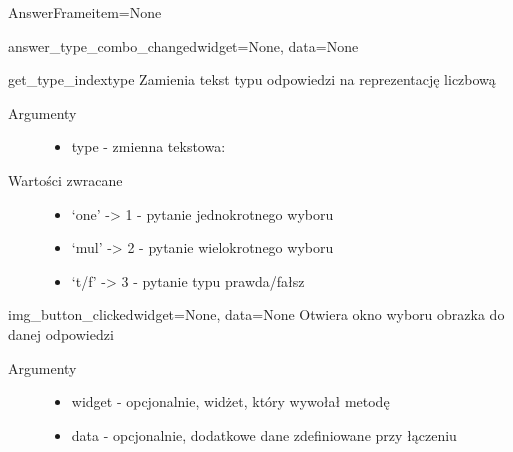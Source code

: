\documentclass[letterpaper,10pt,polish]{manual}
\begin{document}
\begin{classdesc}{AnswerFrame}{item=None}
\begin{methoddesc}{answer\_type\_combo\_changed}{widget=None, data=None}
\begin{description}
\begin{itemize}
\end{itemize}

\end{description}
\end{methoddesc}

\hypertarget{AnswerFrame.AnswerFrame.get\_type\_index}{}\begin{methoddesc}{get\_type\_index}{type}
Zamienia tekst typu odpowiedzi na reprezentację liczbową
\begin{description}
\item[Argumenty] \leavevmode\begin{itemize}
\item {} 
type - zmienna tekstowa:

\end{itemize}

\item[Wartości zwracane] \leavevmode\begin{itemize}
\item {} 
`one' -\textgreater{} 1 - pytanie jednokrotnego wyboru

\item {} 
`mul' -\textgreater{} 2 - pytanie wielokrotnego wyboru

\item {} 
`t/f' -\textgreater{} 3 - pytanie typu prawda/fałsz

\end{itemize}

\end{description}
\end{methoddesc}

\hypertarget{AnswerFrame.AnswerFrame.img\_button\_clicked}{}\begin{methoddesc}{img\_button\_clicked}{widget=None, data=None}
Otwiera okno wyboru obrazka do danej odpowiedzi
\begin{description}
\item[Argumenty] \leavevmode\begin{itemize}
\item {} 
widget - opcjonalnie, widżet, który wywołał metodę

\item {} 
data - opcjonalnie, dodatkowe dane zdefiniowane przy łączeniu

\end{itemize}

\end{description}
\end{methoddesc}


\end{classdesc}
\end{document}
